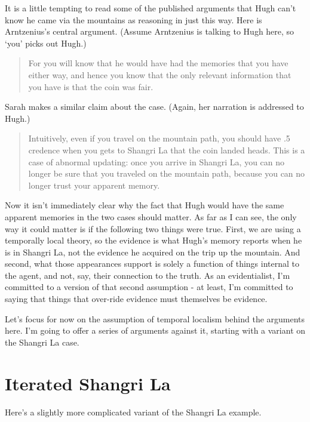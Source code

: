 It is a little tempting to read some of the published arguments that Hugh can't know he came via the mountains as reasoning in just this way. Here is Arntzenius's central argument. (Assume Arntzenius is talking to Hugh here, so `you' picks out Hugh.)

\begin{quote}

For you will know that he would have had the memories that you have either way, and hence you know that the only relevant information that you have is that the coin was fair. ~\citep[356]{Arntzenius2003}
\end{quote}
Sarah  \citet{Moss2012} makes a similar claim about the case. (Again, her narration is addressed to Hugh.)

\begin{quote}

Intuitively, even if you travel on the mountain path, you should have .5 credence when you gets to Shangri La that the coin landed heads. This is a case of abnormal updating: once you arrive in Shangri La, you can no longer be sure that you traveled on the mountain path, because you can no longer trust your apparent memory. ~\citep[241--2]{Moss2012}
\end{quote}
Now it isn't immediately clear why the fact that Hugh would have the same apparent memories in the two cases should matter. As far as I can see, the only way it could matter is if the following two things were true. First, we are using a temporally local theory, so the evidence is what Hugh's memory reports when he is in Shangri La, not the evidence he acquired on the trip up the mountain. And second, what those appearances support is solely a function of things internal to the agent, and not, say, their connection to the truth. As an evidentialist, I'm committed to a version of that second assumption - at least, I'm committed to saying that things that over-ride evidence must themselves be evidence. 

Let's focus for now on the assumption of temporal localism behind the arguments here. I'm going to offer a series of arguments against it, starting with a variant on the Shangri La case.

\section{Iterated Shangri La}
\label{iteratedshangrila}

Here's a slightly more complicated variant of the Shangri La example.

